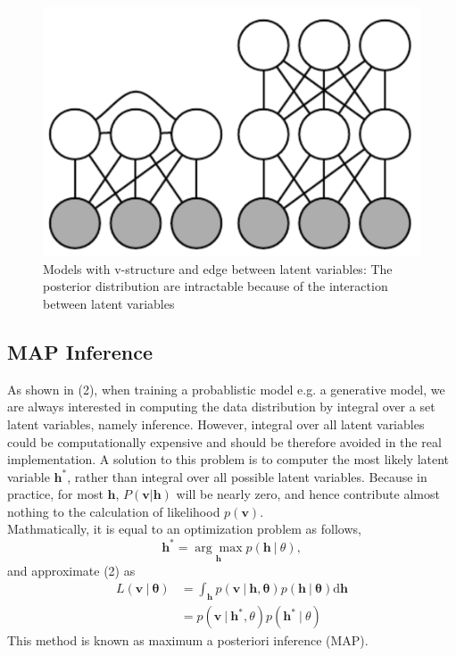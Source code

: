 \documentclass[conference]{IEEEtran}
\begin{document}
\begin{figure}[ht]
	\centering
	\includegraphics[scale=0.8]{picture2.png}
     \caption{Models with v-structure and edge between latent variables: The posterior distribution are intractable because of the interaction between latent variables}
     \label{pic_2}
\end{figure}
\subsection{MAP Inference}
As shown in (2), when training a probablistic model e.g. a generative model, we are always interested in computing the data distribution by integral over a set latent variables, namely inference. However, integral over all latent variables could be computationally expensive and should be therefore avoided in the real implementation. A solution to this problem is to computer the most likely latent variable $\boldsymbol{h^*}$, rather than integral over all possible latent variables. Because in practice, for most $\boldsymbol{h}$, $P(\boldsymbol{v} |\boldsymbol{h})$ will be nearly zero, and hence contribute almost nothing to the calculation of likelihood $p(\boldsymbol{v})$.\cite{Goodfellow-et-al-2016}\cite{doersch2016tutorial}\\

Mathmatically, it is equal to an optimization problem as follows,
\begin{equation}
\boldsymbol{h^*}=\underset{\boldsymbol{h}}{\arg\max}p(\boldsymbol{h}\ |\ \theta),
\end{equation}
and approximate (2) as 
\begin{equation}
  \begin{split}
    L(\boldsymbol{v}\ |\ \boldsymbol{\theta}) &=\int_{\boldsymbol{h}}p(\boldsymbol{v} \ |\ \boldsymbol{h}, \boldsymbol{\theta})p(\boldsymbol{h}\ |\ \boldsymbol{\theta})\mathrm{d}\boldsymbol{h}\\
    &=p(\boldsymbol{v}\ |\ \boldsymbol{h^*}, \theta)p(\boldsymbol{h^*}\ |\ \theta)
  \end{split}  
\end{equation}
This method is known as maximum a posteriori inference (MAP).\\
\end{document}
